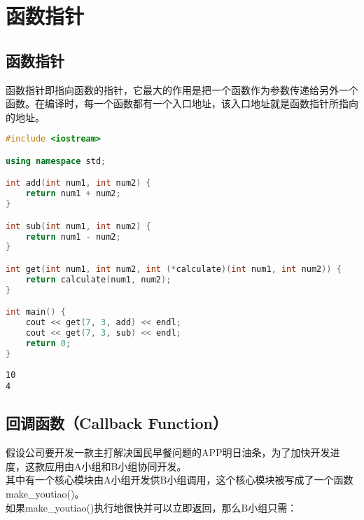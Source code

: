 \newpage

\section{函数指针}

\subsection{函数指针}

函数指针即指向函数的指针，它最大的作用是把一个函数作为参数传递给另外一个函数。在编译时，每一个函数都有一个入口地址，该入口地址就是函数指针所指向的地址。\\


\begin{lstlisting}[language=C++]
#include <iostream>

using namespace std;

int add(int num1, int num2) {
    return num1 + num2;
}

int sub(int num1, int num2) {
    return num1 - num2;
}

int get(int num1, int num2, int (*calculate)(int num1, int num2)) {
    return calculate(num1, num2);
}

int main() {
    cout << get(7, 3, add) << endl;
    cout << get(7, 3, sub) << endl;
    return 0;
}
\end{lstlisting}

\begin{tcolorbox}
	\begin{verbatim}
10
4
	\end{verbatim}
\end{tcolorbox}

\vspace{0.5cm}

\subsection{回调函数（Callback Function）}

假设公司要开发一款主打解决国民早餐问题的APP明日油条，为了加快开发进度，这款应用由A小组和B小组协同开发。\\

其中有一个核心模块由A小组开发供B小组调用，这个核心模块被写成了一个函数make\_youtiao()。\\

如果make\_youtiao()执行地很快并可以立即返回，那么B小组只需：


